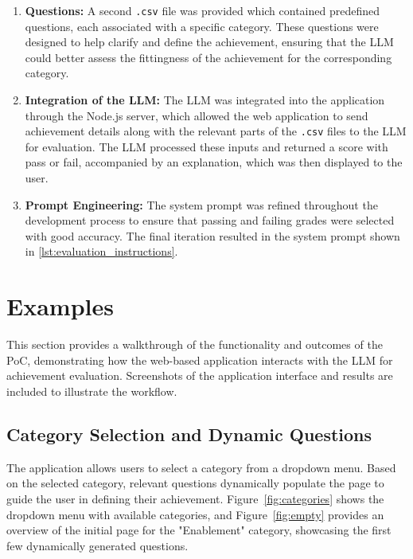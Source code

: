 \begin{enumerate}
    \item \textbf{Questions:} A second \texttt{.csv} file was provided which contained predefined questions, each associated with a specific category. 
    These questions were designed to help clarify and define the achievement, ensuring that the \ac{LLM} could better assess the fittingness of the achievement for the corresponding category.
    
    \item \textbf{Integration of the \ac{LLM}:} The \ac{LLM} was integrated into the application through the Node.js server, 
    which allowed the web application to send achievement details along with the relevant parts of the \texttt{.csv} files to the \ac{LLM} for evaluation. 
    The \ac{LLM} processed these inputs and returned a score with pass or fail, accompanied by an explanation, which was then displayed to the user.

    \item \textbf{Prompt Engineering:} The system prompt was refined throughout the development process to ensure that passing and failing grades were selected with good accuracy. 
    The final iteration resulted in the system prompt shown in \ref{lst:evaluation_instructions}.
\end{enumerate}

\section{Examples}
\label{examples}

This section provides a walkthrough of the functionality and outcomes of the \ac{PoC}, demonstrating how the web-based application interacts with the \ac{LLM} for achievement evaluation. 
Screenshots of the application interface and results are included to illustrate the workflow.

\subsection{Category Selection and Dynamic Questions}
The application allows users to select a category from a dropdown menu. Based on the selected category, relevant questions dynamically populate the page to guide the user in defining their achievement. 
Figure~\ref{fig:categories} shows the dropdown menu with available categories, and Figure~\ref{fig:empty} provides an overview of the initial page for the "Enablement" category, 
showcasing the first few dynamically generated questions.

